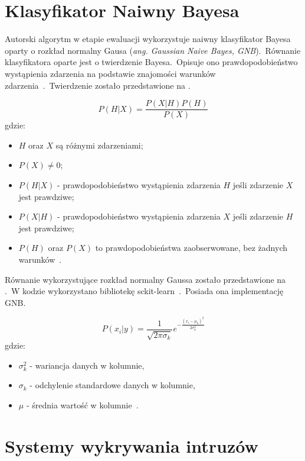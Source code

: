 \section{Klasyfikator Naiwny Bayesa}
Autorski algorytm w etapie ewaluacji wykorzystuje naiwny klasyfikator Bayesa oparty o rozkład normalny Gausa (\textit{ang. Gaussian Naive Bayes, GNB}).\ Równanie klasyfikatora oparte jest o twierdzenie Bayesa.\ Opisuje ono prawdopodobieństwo wystąpienia zdarzenia na podstawie znajomości warunków zdarzenia~\cite{Joyce2003}.\ Twierdzenie zostało przedstawione na .

\begin{equation}\label{math:bayes}
P(H|X) = \frac{P(X|H) P(H)}{P(X)}
\end{equation}
gdzie:
\begin{itemize}
    \item $H$ oraz $X$ są różnymi zdarzeniami;
    \item $P(X) \neq 0$;
    \item $P(H|X)$ - prawdopodobieństwo wystąpienia zdarzenia $H$ jeśli zdarzenie $X$ jest prawdziwe;
    \item $P(X|H)$ - prawdopodobieństwo wystąpienia zdarzenia $X$ jeśli zdarzenie $H$ jest prawdziwe;
    \item $P(H)$ oraz $P(X)$ to prawdopodobieństwa zaobserwowane, bez żadnych warunków~\cite{Leung2007}.
\end{itemize}

Równanie wykorzystujące rozkład normalny Gaussa zostało przedstawione na .\ W kodzie wykorzystano bibliotekę sckit-learn~\cite{scikit-learn}.\ Posiada ona implementację GNB.

\begin{equation}\label{math:gnb}
    P(x_{i}|y) = \frac{1}{\sqrt{2\pi\sigma_{k}}}e^{-\frac{(x_{i}-\mu_{k})^2}{2\sigma_{k}^{2}}}
\end{equation}
gdzie:
\begin{itemize}
        \item[] \textbf{$\sigma_{k}^{2}$} - wariancja danych w kolumnie,
        \item[] \textbf{$\sigma_{k}$} - odchylenie standardowe danych w kolumnie,
        \item[] \textbf{$\mu$} - średnia wartość w kolumnie~\cite{Leung2007}.
\end{itemize}

\section{Systemy wykrywania intruzów}

